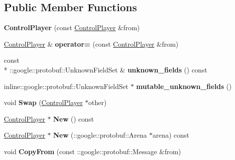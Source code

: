 \subsection*{Public Member Functions}
\begin{DoxyCompactItemize}
\item 
\hypertarget{class_control_player_a4773258dff369c3e618f22915b1ed13c}{{\bfseries Control\-Player} (const \hyperlink{class_control_player}{Control\-Player} \&from)}\label{class_control_player_a4773258dff369c3e618f22915b1ed13c}

\item 
\hypertarget{class_control_player_a1b20164c45224aebee88352c86399be7}{\hyperlink{class_control_player}{Control\-Player} \& {\bfseries operator=} (const \hyperlink{class_control_player}{Control\-Player} \&from)}\label{class_control_player_a1b20164c45224aebee88352c86399be7}

\item 
\hypertarget{class_control_player_ae234e293c6d038e29ac6b84d5fa51130}{const \\*
\-::google\-::protobuf\-::\-Unknown\-Field\-Set \& {\bfseries unknown\-\_\-fields} () const }\label{class_control_player_ae234e293c6d038e29ac6b84d5fa51130}

\item 
\hypertarget{class_control_player_a23294302f5acd784da03d52c49a2c058}{inline\-::google\-::protobuf\-::\-Unknown\-Field\-Set $\ast$ {\bfseries mutable\-\_\-unknown\-\_\-fields} ()}\label{class_control_player_a23294302f5acd784da03d52c49a2c058}

\item 
\hypertarget{class_control_player_a31c6357a93fa21c6739f93bb34c17f78}{void {\bfseries Swap} (\hyperlink{class_control_player}{Control\-Player} $\ast$other)}\label{class_control_player_a31c6357a93fa21c6739f93bb34c17f78}

\item 
\hypertarget{class_control_player_af57ac2d2518b280356cf9d97fe9d7715}{\hyperlink{class_control_player}{Control\-Player} $\ast$ {\bfseries New} () const }\label{class_control_player_af57ac2d2518b280356cf9d97fe9d7715}

\item 
\hypertarget{class_control_player_a693bcd1bbe06f676166d5a39331cc198}{\hyperlink{class_control_player}{Control\-Player} $\ast$ {\bfseries New} (\-::google\-::protobuf\-::\-Arena $\ast$arena) const }\label{class_control_player_a693bcd1bbe06f676166d5a39331cc198}

\item 
\hypertarget{class_control_player_a10ddf43b10f0fc2578bd5ca37d426ed2}{void {\bfseries Copy\-From} (const \-::google\-::protobuf\-::\-Message \&from)}\label{class_control_player_a10ddf43b10f0fc2578bd5ca37d426ed2}


\end{DoxyCompactItemize}
